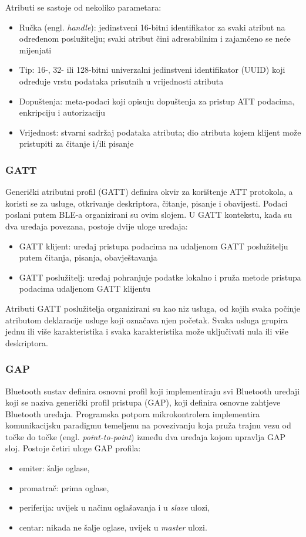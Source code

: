 Atributi se sastoje od nekoliko parametara:
\begin{itemize}
	\item Ručka (engl. \textit{handle}): jedinstveni 16-bitni identifikator za svaki atribut na određenom poslužitelju; svaki atribut čini adresabilnim i zajamčeno se neće mijenjati
	\item Tip: 16-, 32- ili 128-bitni univerzalni jedinstveni identifikator (UUID) koji određuje vrstu podataka prisutnih u vrijednosti atributa
	\item Dopuštenja: meta-podaci koji opisuju dopuštenja za pristup ATT podacima, enkripciju i autorizaciju
	\item Vrijednost: stvarni sadržaj podataka atributa; dio atributa kojem klijent može pristupiti za čitanje i/ili pisanje
\end{itemize}


\subsubsection{GATT}
Generički atributni profil (GATT) definira okvir za korištenje ATT protokola, a koristi se za usluge, otkrivanje deskriptora, čitanje, pisanje i obavijesti. Podaci poslani putem BLE-a organizirani su ovim slojem.
U GATT kontekstu, kada su dva uređaja povezana, postoje dvije uloge uređaja:
\begin{itemize}
	\item GATT klijent: uređaj pristupa podacima na udaljenom GATT poslužitelju putem čitanja, pisanja, obavještavanja 
	\item  GATT poslužitelj: uređaj pohranjuje podatke lokalno i pruža metode pristupa podacima udaljenom GATT klijentu
\end{itemize}

Atributi GATT poslužitelja organizirani su kao niz usluga, od kojih svaka počinje atributom deklaracije usluge koji označava njen početak. Svaka usluga grupira jednu ili više karakteristika i svaka karakteristika može uključivati nula ili više deskriptora.

\subsubsection{GAP}
Bluetooth sustav definira osnovni profil koji implementiraju svi Bluetooth uređaji koji se naziva generički profil pristupa (GAP), koji definira osnovne zahtjeve Bluetooth uređaja. Programska potpora mikrokontrolera implementira komunikacijsku paradigmu temeljenu na povezivanju koja pruža trajnu vezu od točke do točke (engl. \textit{point-to-point}) između dva uređaja kojom upravlja GAP sloj. Postoje četiri uloge GAP profila:
\begin{itemize}
	\item emiter: šalje oglase,
	\item promatrač: prima oglase,
	\item periferija: uvijek u načinu oglašavanja i u \textit{slave} ulozi, 
	\item centar: nikada ne šalje oglase, uvijek u \textit{master} ulozi.
\end{itemize}

